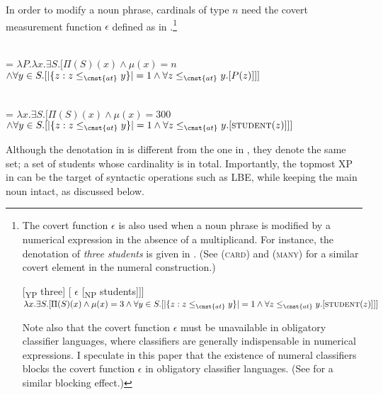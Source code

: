 \documentclass[output=paper]{langscibook}
\begin{document}
\noindent In order to modify a noun phrase, cardinals of type $n$ need the covert measurement function $\epsilon$ defined as in .\footnote{The covert function $\epsilon$ is also used when a noun phrase is modified by a numerical expression in the absence of a multiplicand. For instance, the denotation of \textit{three students} is given in . (See \citealt{Scontras2014} (\textsc{card}) and \citealt{Champollion2017} (\textsc{many}) for a similar covert element in the numeral construction.)

\ea
\ea {[} [\textsubscript{YP} three] [ $\epsilon$ [\textsubscript{NP} students]]]
\ex\label{tat:simple}  \\
$\lambda x.\exists S.[\Pi(S)(x) \wedge \mu(x) = 3 \wedge \forall y \in S.[\vert\{z: z\leq_{\cnst{at}}y\}\vert = 1 \wedge \forall z\leq_{\cnst{at}}y.[\textsc{student}(z)]]]$
\z\z

\noindent Note also that the covert function $\epsilon$ must be unavailable in obligatory classifier languages, where classifiers are generally indispensable in numerical expressions. I speculate in this paper that the existence of numeral classifiers blocks the covert function $\epsilon$ in obligatory classifier languages. (See \citealt{Chierchia1998} for a similar blocking effect.)
}

\ea
\ea\label{tat:ep}
\sib{$\epsilon$} \\
= $\lambda P.\lambda x.\exists S.[\Pi(S)(x) \wedge \mu(x) = n$\\
\hspace*{\fill}$\wedge \forall y \in S.[\vert\{z: z\leq_{\cnst{at}}y\}\vert = 1 \wedge \forall z\leq_{\cnst{at}}y.[P(z)]]]$

\ex\label{tat:ep2}
\\
 = $\lambda x.\exists S.[\Pi(S)(x) \wedge \mu(x) = 300$\\
\hspace*{\fill}$\wedge \forall y \in S.[\vert\{z: z\leq_{\cnst{at}}y\}\vert = 1 \wedge \forall z\leq_{\cnst{at}}y.[\textsc{student}(z)]]]$
\z\z

\noindent Although the denotation in  is different from the one in , they denote the same set; a set of students whose cardinality is  in total. Importantly, the topmost XP in  can be the target of syntactic operations such as LBE, while keeping the main noun intact, as discussed below.
\end{document}
